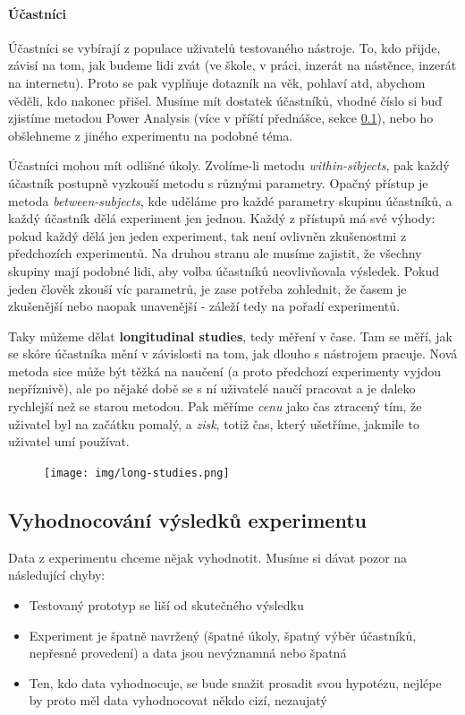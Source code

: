 \documentclass[10pt,a4paper]{article}
\begin{document}
\paragraph{Účastníci} Účastníci se vybírají z populace uživatelů testovaného nástroje. To, kdo přijde, závisí na tom, jak budeme lidi zvát (ve škole, v práci, inzerát na nástěnce, inzerát na internetu). Proto se pak vyplňuje dotazník na věk, pohlaví atd, abychom věděli, kdo nakonec přišel. Musíme mít dostatek účastníků, vhodné číslo si buď zjistíme metodou Power Analysis (více v příští přednášce, sekce \ref{sec:vyhodnoceni}), nebo ho obšlehneme z jiného experimentu na podobné téma.

Účastníci mohou mít odlišné úkoly. Zvolíme-li metodu \textit{within-sibjects}, pak každý účastník postupně vyzkouší metodu s různými parametry. Opačný přístup je metoda \textit{between-subjects}, kde uděláme pro každé parametry skupinu účastníků, a každý účastník dělá experiment jen jednou. Každý z přístupů má své výhody: pokud každý dělá jen jeden experiment, tak není ovlivněn zkušenostmi z předchozích experimentů. Na druhou stranu ale musíme zajistit, že všechny skupiny mají podobné lidi, aby volba účastníků neovlivňovala výsledek. Pokud jeden člověk zkouší víc parametrů, je zase potřeba zohlednit, že časem je zkušenější nebo naopak unavenější - záleží tedy na pořadí experimentů.

Taky můžeme dělat \textbf{longitudinal studies}, tedy měření v čase. Tam se měří, jak se skóre účastníka mění v závislosti na tom, jak dlouho s nástrojem pracuje. Nová metoda sice může být těžká na naučení (a proto předchozí experimenty vyjdou nepříznivě), ale po nějaké době se s ní uživatelé naučí pracovat a je daleko rychlejší než se starou metodou. Pak měříme \textit{cenu} jako čas ztracený tím, že uživatel byl na začátku pomalý, a \textit{zisk}, totiž čas, který ušetříme, jakmile to uživatel umí používat.

\begin{figure}[ht!]
\centering
\texttt{[image: img/long-studies.png]}
\end{figure}

\subsection{Vyhodnocování výsledků experimentu}
\label{sec:vyhodnoceni}

Data z experimentu chceme nějak vyhodnotit. Musíme si dávat pozor na následující chyby:
\begin{itemize}
\item Testovaný prototyp se liší od skutečného výsledku
\item Experiment je špatně navržený (špatné úkoly, špatný výběr účastníků, nepřesné provedení) a data jsou nevýznamná nebo špatná
\item Ten, kdo data vyhodnocuje, se bude snažit prosadit svou hypotézu, nejlépe by proto měl data vyhodnocovat někdo cizí, nezaujatý
\end{itemize}
\end{document}

